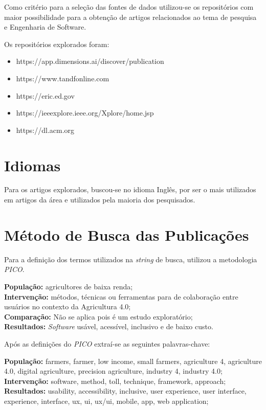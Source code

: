 \documentclass[12pt]{article}
\begin{document}
Como critério para a seleção das fontes de dados utilizou-se os repositórios com maior possibilidade para a obtenção de artigos relacionados ao tema de pesquisa e Engenharia de Software.

Os repositórios explorados foram:

\begin{itemize}
	\item https://app.dimensions.ai/discover/publication
	\item https://www.tandfonline.com
	\item https://eric.ed.gov
	\item https://ieeexplore.ieee.org/Xplore/home.jsp
	\item https://dl.acm.org
\end{itemize}

\section{Idiomas}

Para os artigos explorados, buscou-se no idioma Inglês, por ser o mais utilizados em artigos da área e utilizados pela maioria dos pesquisados.

\section{Método de Busca das Publicações}

Para a definição dos termos utilizados na \textit{string} de busca, utilizou a metodologia \textit{PICO}.

\noindent\textbf{População:} agricultores de baixa renda; \\
\textbf{Intervenção:} métodos, técnicas ou ferramentas para de colaboração entre usuários no contexto da Agricultura 4.0; \\
\textbf{Comparação:} Não se aplica pois é um estudo exploratório; \\
\textbf{Resultados:} \textit{Software} usável, acessível, inclusivo e de baixo custo.

\noindent Após as definições do \textit{PICO} extraí-se as seguintes palavras-chave:

\noindent\textbf{População:} farmers, farmer, low income, small farmers, agriculture 4, agriculture 4.0, digital agriculture, precision agriculture, industry 4, industry 4.0; \\
\textbf{Intervenção:} software, method, toll, technique, framework, approach; \\
\textbf{Resultados:} usability, accessibility, inclusive, user experience, user interface, experience, interface, ux, ui, ux/ui, mobile, app, web application;
\end{document}
